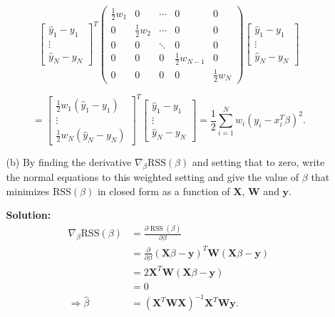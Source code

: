 \documentclass[10pt]{article}
\begin{document}
\begin{enumerate}[1.]
\begin{itemize}
        	$$\left[\begin{array}{c}\hat{y}_{1}-y_{1} \\ \vdots \\ \hat{y}_{N}-y_{N}\end{array}\right]^T
        	\left(                
        	\begin{array}{ccccc}   
        	\frac{1}{2}w_1 & 0 & \cdots & 0 & 0\\ 
        	0 &  \frac{1}{2}w_2& \cdots &0 &0\\ 
        	0 & 0& \ddots &0 &0\\
        	0 & 0& 0 &\frac{1}{2}w_{N-1} &0\\
        	0 & 0& 0 &0 &\frac{1}{2}w_N
        	\end{array}
        	\right)
        	\left[\begin{array}{c}\hat{y}_{1}-y_{1} \\ \vdots \\ \hat{y}_{N}-y_{N}\end{array}\right]$$
        	
        	$$=\left[\begin{array}{c}\frac{1}{2}w_1(\hat{y}_{1}-y_{1}) \\ \vdots \\ \frac{1}{2}w_N(\hat{y}_{N}-y_{N})\end{array}\right]^T\left[\begin{array}{c}\hat{y}_{1}-y_{1} \\ \vdots \\ \hat{y}_{N}-y_{N}\end{array}\right]
        	=\frac{1}{2} \sum_{i=1}^{N} w_{i}\left(y_{i}-x_{i}^{T} \beta \right)^{2}.
        	$$
        	
        	
        	
			\item[(b)] By finding the derivative $\nabla_{\beta}\textrm{RSS}(\beta)$ and setting that to zero, 
			write the normal equations to this weighted setting and 
			give the value of $\beta$ that minimizes $\textrm{RSS}(\beta)$ 
			in closed form as a function of $\mathbf{X}$, $\mathbf{W}$ and $\mathbf{y}$.~
        	
        	\textbf{Solution:} \begin{align*}
        	\nabla_{\beta} \mathrm{RSS}(\beta)
			&=\frac{\partial \operatorname{RSS}(\beta)}{\partial \beta} \\&=\frac{\partial}{\partial \beta}(\mathbf{X} \beta-\mathbf{y})^{T} 
			\mathbf{W}(\mathbf{X} \beta-\mathbf{y})\\
        		&= 2\mathbf{X}^T\mathbf{W}(\mathbf{X} \beta-\mathbf{y})\\
        		&=0\\
        		\Rightarrow \hat{\beta} &= (\mathbf{X}^T\mathbf{W}\mathbf{X})^{-1}\mathbf{X}^T\mathbf{W}\mathbf{y}.
        	\end{align*}
        	

\end{itemize}
\end{enumerate}
\end{document}
